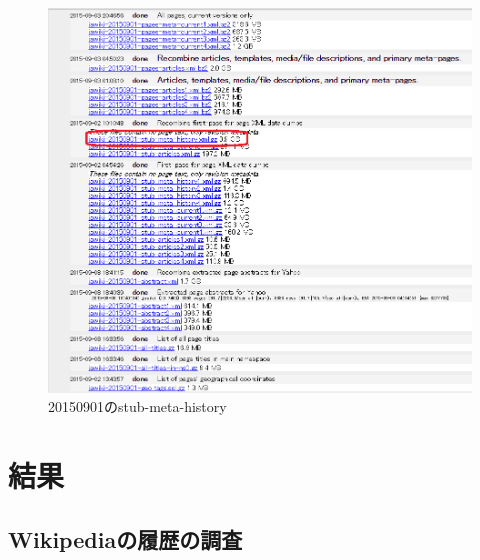\begin{figure}[H]
\centering
\includegraphics[width=14cm]{wiki20150901.PNG}
\caption{20150901のstub-meta-history}\label{サンプル図}
\end{figure}








\chapter{結果}



\section{Wikipediaの履歴の調査}



